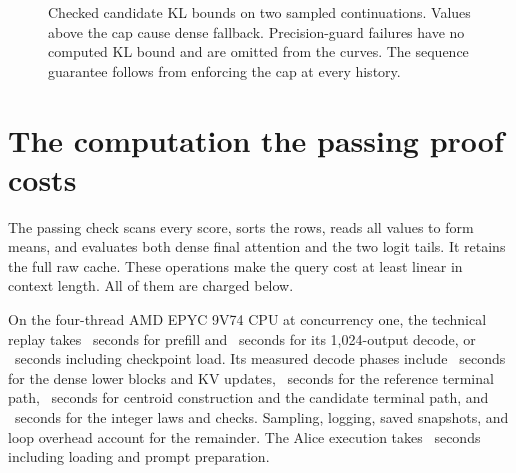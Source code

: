 \documentclass[10pt]{article}
\theoremstyle{definition}\newtheorem{definition}[theorem]{Definition}
\begin{document}
\begin{figure}[t]
\centering
{}
\caption{Checked candidate KL bounds on two sampled continuations. Values above the cap cause dense fallback. Precision-guard failures have no computed KL bound and are omitted from the curves. The sequence guarantee follows from enforcing the cap at every history.}
\label{fig:trace}
\end{figure}

\section{The computation the passing proof costs}
\label{sec:cost}
The passing check scans every score, sorts the rows, reads all values to form means, and evaluates both dense final attention and the two logit tails. It retains the full raw cache. These operations make the query cost at least linear in context length. All of them are charged below.

On the four-thread AMD EPYC 9V74 CPU at concurrency one, the technical replay takes \TechPrefill\ seconds for prefill and \TechDecode\ seconds for its 1,024-output decode, or \TechTotal\ seconds including checkpoint load. Its measured decode phases include \TechLower\ seconds for the dense lower blocks and KV updates, \TechRef\ seconds for the reference terminal path, \TechCand\ seconds for centroid construction and the candidate terminal path, and \TechCheck\ seconds for the integer laws and checks. Sampling, logging, saved snapshots, and loop overhead account for the remainder. The Alice execution takes \LitTotal\ seconds including loading and prompt preparation.
\end{document}
